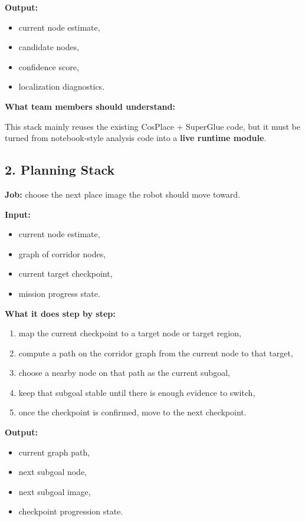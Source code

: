 \documentclass[11pt,a4paper]{article}
\begin{document}
\textbf{Output:}

\begin{itemize}[nosep]
  \item current node estimate,
  \item candidate nodes,
  \item confidence score,
  \item localization diagnostics.
\end{itemize}

\textbf{What team members should understand:}

This stack mainly reuses the existing CosPlace + SuperGlue code, but it must be
turned from notebook-style analysis code into a \textbf{live runtime module}.


\subsection{2. Planning Stack}

\textbf{Job:} choose the next place image the robot should move toward.

\textbf{Input:}

\begin{itemize}[nosep]
  \item current node estimate,
  \item graph of corridor nodes,
  \item current target checkpoint,
  \item mission progress state.
\end{itemize}

\textbf{What it does step by step:}

\begin{enumerate}[nosep]
  \item map the current checkpoint to a target node or target region,
  \item compute a path on the corridor graph from the current node to that target,
  \item choose a nearby node on that path as the current subgoal,
  \item keep that subgoal stable until there is enough evidence to switch,
  \item once the checkpoint is confirmed, move to the next checkpoint.
\end{enumerate}

\textbf{Output:}

\begin{itemize}[nosep]
  \item current graph path,
  \item next subgoal node,
  \item next subgoal image,
  \item checkpoint progression state.
\end{itemize}
\end{document}
